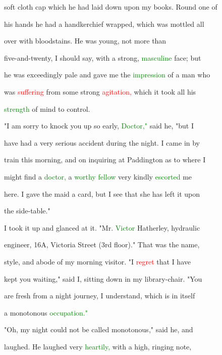  soft cloth \textcolor{BurntOrange}{cap} which he had laid down upon my books. Round one of

 his hands he had a handkerchief wrapped, which was mottled all

 over with bloodstains. He was \textcolor{BurntOrange}{young,} not more than

 five-and-twenty, I should say, with a strong, \textcolor{green}{masculine} face; but

 he was exceedingly pale and gave me the \textcolor{green}{impression} of a man who

 was \textcolor{red}{suffering} from some strong \textcolor{red}{agitation,} which it took all his

 \textcolor{green}{strength} of mind to control.



 "I am sorry to knock you up so early, \textcolor{green}{Doctor,"} said he, "but I

 have had a very serious \textcolor{BurntOrange}{accident} during the night. I came in by

 train this morning, and on inquiring at Paddington as to where I

 might find a \textcolor{green}{doctor,} a \textcolor{green}{worthy} \textcolor{green}{fellow} very kindly \textcolor{green}{escorted} me

 here. I gave the maid a card, but I see that she has left it upon

 the side-table."



 I took it up and glanced at it. "Mr. \textcolor{green}{Victor} Hatherley, hydraulic

 engineer, 16A, Victoria Street (3rd floor)." That was the name,

 style, and abode of my morning \textcolor{BurntOrange}{visitor.} "I \textcolor{red}{regret} that I have

 kept you \textcolor{BurntOrange}{waiting,"} said I, sitting down in my library-chair. "You

 are fresh from a night \textcolor{BurntOrange}{journey,} I understand, which is in itself

 a monotonous \textcolor{green}{occupation."}



 "Oh, my night could not be called monotonous," said he, and

 \textcolor{BurntOrange}{laughed.} He \textcolor{BurntOrange}{laughed} very \textcolor{green}{heartily,} with a high, ringing note,

